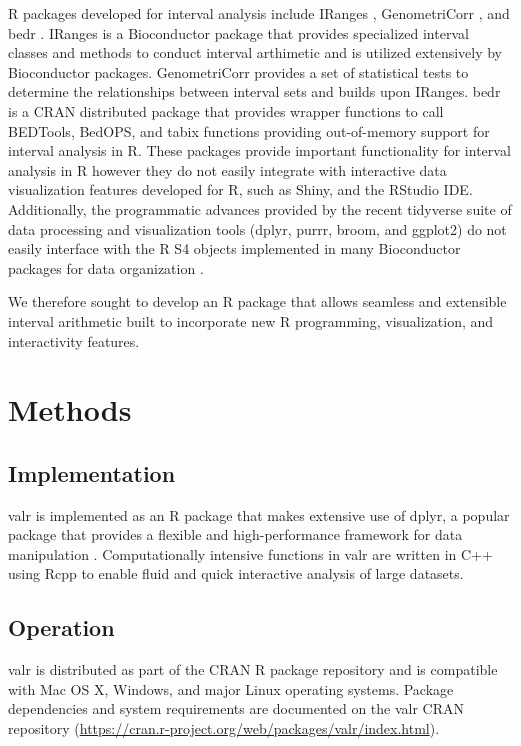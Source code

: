 \documentclass[9pt,a4paper]{extarticle}
\begin{document}
R packages developed for interval analysis include IRanges \cite{lawrence_software_2013}, GenometriCorr \cite{favorov_exploring_2012}, and bedr \cite{haider_bedr_2016}. IRanges is a Bioconductor package that provides specialized interval classes and methods to conduct interval arthimetic and is utilized extensively by Bioconductor packages. GenometriCorr provides a set of statistical tests to determine the relationships between interval sets and builds upon IRanges. bedr is a CRAN distributed package that provides wrapper functions to call BEDTools, BedOPS, and tabix functions providing out-of-memory support for interval analysis in R. These packages provide important functionality for interval analysis in R however they do not easily integrate with interactive data visualization features developed for R, such as Shiny\cite{chang_shiny_2017}, and the RStudio IDE. Additionally, the programmatic advances provided by the recent tidyverse suite of data processing and visualization tools (dplyr, purrr, broom, and ggplot2) do not easily interface with the R S4 objects implemented in many Bioconductor packages for data organization \cite{wickham_tidyverse_2017}. 

We therefore sought to develop an R package that allows seamless and extensible interval arithmetic built to incorporate new R programming, visualization, and interactivity features.

\section*{Methods}
\subsection*{Implementation}
valr is implemented as an R package that makes extensive use of dplyr, a popular package that provides a flexible and high-performance framework for data manipulation \cite{wickham_dplyr_2016}. Computationally intensive functions in valr are written in C++ using Rcpp to enable fluid and quick interactive analysis of large datasets\cite{eddelbuettel_rcpp_2011}. 

\subsection*{Operation}
valr is distributed as part of the CRAN R package repository and is compatible with Mac OS X, Windows, and major Linux operating systems. Package dependencies and system requirements are documented on the valr CRAN repository (\url{https://cran.r-project.org/web/packages/valr/index.html}).
\end{document}

